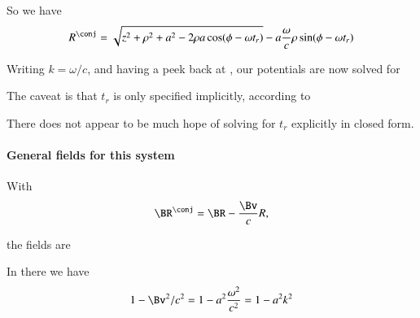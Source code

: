 {So we have
%
\begin{equation}\label{eqn:relativisticElectrodynamicsExamReflection:150}
R^\conj = \sqrt{z^2 + \rho^2 + a^2 - 2 \rho a \cos( \phi - \omega t_r ) }
-a \frac{\omega }{c} \rho \sin(\phi - \omega t_r)
\end{equation}

Writing \(k = \omega/c\), and having a peek back at , our potentials are now solved for


The caveat is that \(t_r\) is only specified implicitly, according to


There does not appear to be much hope of solving for \(t_r\) explicitly in closed form.


\paragraph{General fields for this system}

With
%
\begin{equation}\label{eqn:relativisticElectrodynamicsExamReflection:540}
\BR^\conj = \BR - \frac{\Bv}{c} R,
\end{equation}

the fields are


In there we have
%
\begin{equation}\label{eqn:relativisticElectrodynamicsExamReflection:580}
1 - \Bv^2/c^2 = 1 - a^2 \frac{\omega^2}{c^2} = 1 - a^2 k^2
\end{equation}

}
